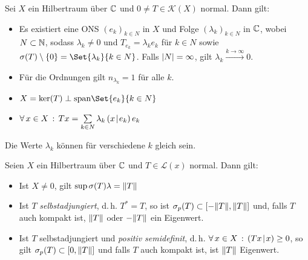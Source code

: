 \documentclass{cheat-sheet}
\newcommand{\LSO}{\mathcal{L}} %
\newcommand{\scp}[2]{\left( #1 \!\mid\! #2 \right)} %
\newcommand{\convWith}[1]{\xrightarrow{#1 \to \infty}} %
\begin{document}
\begin{satz}
  Sei $X$ ein Hilbertraum über $\mathbb{C}$ und $0 \not= T \in \mathcal{K}(X)$ normal. Dann gilt:
  \begin{itemize}
    \item Es existiert eine ONS $(e_k)_{k \in N}$ in $X$ und Folge $(\lambda_k)_{k \in N}$ in $\mathbb{C}$, wobei $N \subset \mathbb{N}$, sodass $\lambda_k \not= 0$ und $T_{e_k} = \lambda_k e_k$ für $k \in N$ sowie $\sigma(T) \setminus \{ 0 \} = \Set{ \lambda_k }{ k \in N }$. Falls $\lvert N\rvert = \infty$, gilt $\lambda_k \convWith{k} 0$.
    \item Für die Ordnungen gilt $n_{\lambda_k} = 1$ für alle $k$.
    \item $X = \ker(T) \perp \mathrm{span} \Set{ e_k }{ k \in N }$
    \item $\fa{x \in X} Tx = \sum_{k \in N} \lambda_k \scp{x}{e_k} e_k$
  \end{itemize}
\end{satz}

\begin{bem}
  Die Werte $\lambda_k$ können für verschiedene $k$ gleich sein.
\end{bem}

\begin{lem}
  Seien $X$ ein Hilbertraum über $\mathbb{C}$ und $T \in \LSO(x)$ normal. Dann gilt:
  \begin{itemize}
    \item  Ist $X \not= 0$, gilt $\sup \sigma(T) \lambda = \lVert T\rVert$
    \item Ist $T$ \emph{selbstadjungiert}, d.\,h. $T^* = T$, so ist $\sigma_p(T) \subset \left[ -\lVert T\rVert, \lVert T\rVert \right]$ und, falls $T$ auch kompakt ist, $\lVert T\rVert$ oder $-\lVert T\rVert$ ein Eigenwert.
    \item Ist $T$ selbstadjungiert und \emph{positiv semidefinit}, d.\,h. $\fa{x \in X} \scp{Tx}{x} \geq 0$, so gilt $\sigma_p(T) \subset \left[ 0, \lVert T\rVert \right]$ und falls $T$ auch kompakt ist, ist $\lVert T\rVert$ Eigenwert.
  \end{itemize}
\end{lem}
\end{document}
